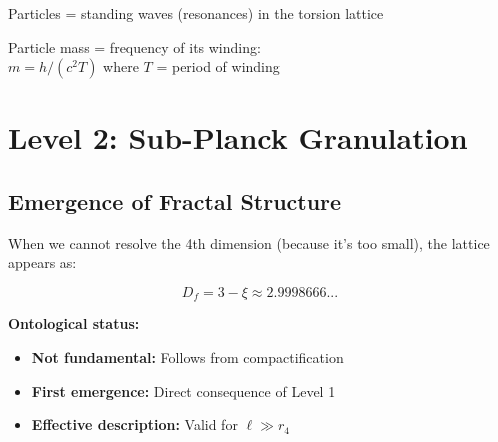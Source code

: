	\begin{important}
		Particles = standing waves (resonances) in the torsion lattice
		
		\vspace{0.3cm}
		
		
		\vspace{0.3cm}
		
		Particle mass = frequency of its winding:\\
		$m = h/(c^2 T)$ where $T$ = period of winding
	\end{important}
	
	\section{Level 2: Sub-Planck Granulation}
	
	\subsection{Emergence of Fractal Structure}
	
	When we cannot resolve the 4th dimension (because it's too small), the lattice appears as:
	
	\begin{equation}
		\boxed{D_f = 3 - \xi \approx 2.9998666...}
	\end{equation}
	
	\textbf{Ontological status:}
	\begin{itemize}
		\item \textbf{Not fundamental:} Follows from compactification
		\item \textbf{First emergence:} Direct consequence of Level 1
		\item \textbf{Effective description:} Valid for $\ell \gg r_4$
	\end{itemize}
	
